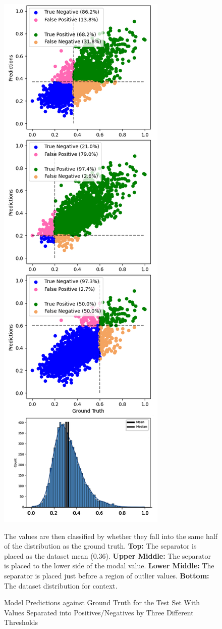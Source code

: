 \begin{figure}[p]
	\centering
	\includegraphics[scale=0.47]{Figures/best_results_analysis.png}
	\caption{Model Predictions against Ground Truth for the Test Set With Values Separated into Positives/Negatives by Three Different Thresholds} {The values are then classified by whether they fall into the same half of the distribution as the ground truth. \textbf{Top:} The separator is placed as the dataset mean (0.36). \textbf{Upper Middle:} The separator is placed to the lower side of the modal value. \textbf{Lower Middle:} The separator is placed just before a region of outlier values. \textbf{Bottom:} The dataset distribution for context.}
	\label{fig:best_analysis}
\end{figure}

